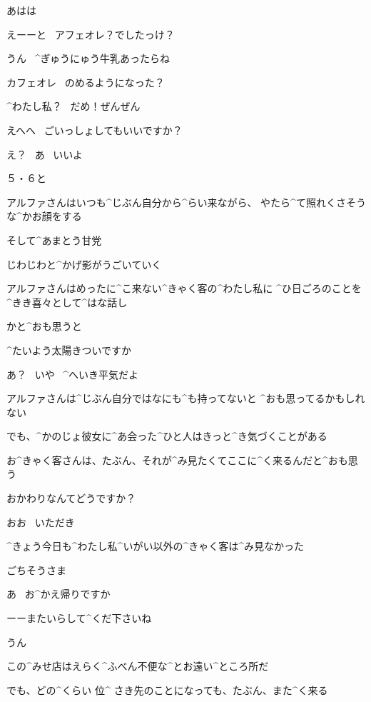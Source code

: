 \Alpha あはは

\page[100]
\Alpha えーーと
\ アフェオレ？でしたっけ？

\Alpha うん
\ ^{ぎゅうにゅう}{牛乳}あったらね

\Narrator カフェオレ
\ のめるようになった？

\Alpha ^{わたし}{私}？
\ だめ！ぜんぜん

\page[101]
\Alpha えへへ
\ ごいっしょしてもいいですか？

\Narrator え？
\ あ
\ いいよ

\Alpha ５・６と

\Narrator アルファさんはいつも^{じぶん}{自分}から^{らい}{来}ながら、
やたら^{て}{照}れくさそうな^{かお}{顔}をする

\Narrator そして^{あまとう}{甘党}

\page[102]
\Narrator じわじわと^{かげ}{影}がうごいていく

\Narrator アルファさんはめったに^{こ}{来}ない^{きゃく}{客}の^{わたし}{私}に
^{ひ}{日}ごろのことを^{きき}{喜々}として^{はな}{話}し

\page[103]
\Narrator かと^{おも}{思}うと

\Alpha ^{たいよう}{太陽}きついですか

\Narrator あ？
\ いや
\ ^{へいき}{平気}だよ

\page[104]
\Narrator アルファさんは^{じぶん}{自分}ではなにも^{も}{持}ってないと
^{おも}{思}ってるかもしれない

\Narrator でも、^{かのじょ}{彼女}に^{あ}{会}った^{ひと}{人}はきっと^{き}{気}づくことがある

\Narrator お^{きゃく}{客}さんは、たぶん、それが^{み}{見}たくてここに^{く}{来}るんだと^{おも}{思}う

\page[105]
\Alpha おかわりなんてどうですか？

\Narrator おお
\ いただき

\Narrator ^{きょう}{今日}も^{わたし}{私}^{いがい}{以外}の^{きゃく}{客}は^{み}{見}なかった

\page[106]
\Narrator ごちそうさま

\Alpha あ
\ お^{かえ}{帰}りですか

\Alpha ーーまたいらして^{くだ}{下}さいね

\Narrator うん

\page[107]
\Narrator この^{みせ}{店}はえらく^{ふべん}{不便}な^{とお}{遠}い^{ところ}{所}だ

\Narrator でも、どの^{くらい }{位}^{ さき}{先}のことになっても、たぶん、また^{く}{来}る

